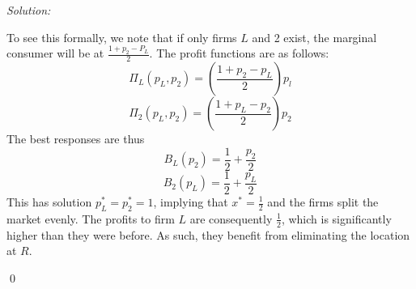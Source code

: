 \documentclass[12pt]{article}
\newenvironment{problem}[2][Problem]{\begin{trivlist}
\item[\hskip \labelsep {\bfseries #1}\hskip \labelsep {\bfseries #2.}]}{\end{trivlist}}
\newenvironment{sol}
    {\emph{Solution:}
    }
    {
    \qed
    }
\begin{document}
\begin{sol}
\begin{enumerate}[label=\alph*) ]
        To see this formally, we note that if only firms $L$ and 2 exist, the marginal consumer will be at $\frac{1 + p_2 - P_L}{2}$. The profit functions are as follows:
        \[\Pi_L(p_L, p_2) = \left(\frac{1 + p_2 - p_L}{2}\right)p_l\]
        \[\Pi_2(p_L, p_2) = \left(\frac{1 + p_L - p_2}{2}\right)p_2\]
        The best responses are thus
        \[B_L(p_2) = \frac{1}{2} + \frac{p_2}{2}\]
        \[B_2(p_L) = \frac{1}{2} + \frac{p_L}{2}\]
        This has solution $p_L^* = p_2^* = 1$, implying that $x^* = \frac{1}{2}$ and the firms split the market evenly. The profits to firm $L$ are consequently $\frac{1}{2}$, which is significantly higher than they were before. As such, they benefit from eliminating the location at $R$.
    \end{enumerate}
\end{sol}
\begin{problem}{4}
\end{problem}
\end{document}

